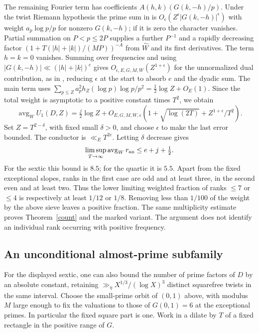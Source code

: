 \documentclass[11pt]{article}
\begin{document}
The remaining Fourier term has coefficients $A(h,k)(G(k,-h)/p)$. Under the twist Riemann hypothesis the prime sum in \cite[eq.~(19)]{nacc} is $O_\epsilon(Z^\epsilon |G(k,-h)|^\epsilon)$ with weight $a_p\log p/p$ for nonzero $G(k,-h)$; if it is zero the character vanishes. Partial summation on $P<p\le2P$ supplies a further $P^{-1}$ and a rapidly decreasing factor $(1+T(|h|+|k|)/(MP))^{-A}$ from $\widehat W$ and its first derivatives. The term $h=k=0$ vanishes. Summing over frequencies and using $|G(k,-h)|\ll (|h|+|k|)^e$ gives $O_{\epsilon,E,G,M,W}(Z^{1+\epsilon})$ for the unnormalized dual contribution, as in \cite[eqs.~(20)--(22)]{nacc}, reducing $\epsilon$ at the start to absorb $e$ and the dyadic sum. The main term uses
$\sum_{p\le Z}a_p^2 h_Z(\log p)\log p/p^2=\tfrac12\log Z+O_E(1)$.
Since the total weight is asymptotic to a positive constant times $T^2$, we obtain
\[
 \operatorname{avg}_W U_1(D,Z)
   =\tfrac j2\log Z+O_{E,G,M,W,\epsilon}
      (1+\sqrt{\log(2T)}+Z^{1+\epsilon}/T^2).
\]
Set $Z=T^{2-\delta}$, with fixed small $\delta>0$, and choose $\epsilon$ to make the last error bounded. The conductor is $\ll_E T^{2e}$. Letting $\delta$ decrease gives
\[
 \limsup_{T\to\infty}\operatorname{avg}_W r_{\rm an}
                  \le e+j+\tfrac12.
\]
For the sextic this bound is $8.5$; for the quartic it is $5.5$. Apart from the fixed exceptional slopes, ranks in the first case are odd and at least three, in the second even and at least two. Thus the lower limiting weighted fraction of ranks $\le7$ or $\le4$ is respectively at least $1/12$ or $1/8$. Removing less than $1/100$ of the weight by the above sieve leaves a positive fraction. The same multiplicity estimate proves Theorem~\ref{count} and the marked variant. The argument does not identify an individual rank occurring with positive frequency.

\subsection{An unconditional almost-prime subfamily}
For the displayed sextic, one can also bound the number of prime factors of $D$ by an absolute constant, retaining
$\gg_\eta X^{1/3}/(\log X)^3$ distinct squarefree twists in the same interval. Choose the small-prime orbit of $(0,1)$ above, with modulus $M$ large enough to fix the valuations to those of $G(0,1)=6$ at the exceptional primes. In particular the fixed square part is one. Work in a dilate by $T$ of a fixed rectangle in the positive range of $G$.
\end{document}
